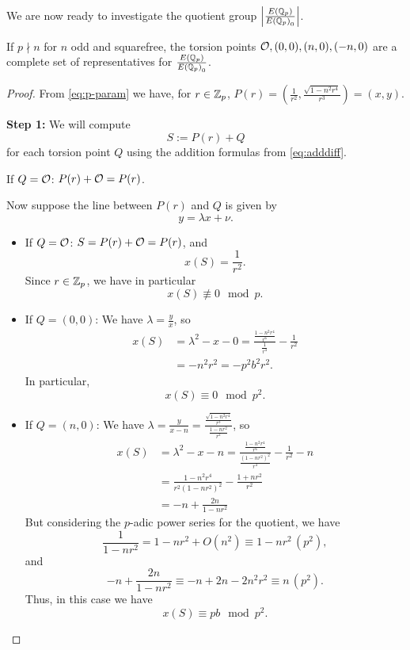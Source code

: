 \documentclass[12pt, a4paper]{report}
\begin{document}
We are now ready to investigate the quotient group $\left| \frac{{E({\mathbb Q}_p)}}{{E({\mathbb Q}_p)}_0}
\right|$.

\begin{thm} 
  If $p \nmid n$ for $n$ odd and squarefree, the torsion points ${\mathcal O}, (0,0), (n,0), (-n,0)$
  are a complete set of representatives for $\frac{{E({\mathbb Q}_p)}}{{E({\mathbb Q}_p)}_0}$.
\end{thm}
\begin{proof}
  From \autoref{eq:p-param} we have, for $r \in {\mathbb Z}_p$,
  $P(r) = (\frac{1}{r^2}, \frac{\sqrt{1-n^2r^4}}{r^3}) = (x,y)$.

  \textbf{Step 1:} We will compute $$S := P(r) + Q$$ for each torsion point $Q$ using
  the addition formulas from \autoref{eq:adddiff}.
   
  If $Q = {\mathcal O}$: $P(r) + {\mathcal O} = P(r)$.

  Now suppose the line between $P(r)$ and $Q$ is given by
  \[y = \lambda x + \nu.\]

  \begin{itemize}
    
  \item If $Q = {\mathcal O}$: $S = P(r) + {\mathcal O} = P(r)$, and
    \[x(S) = \frac{1}{r^2}.\]
    Since $r \in {\mathbb Z}_p$, we have in particular
    \[x(S) \not\equiv 0 \mod{p}.\]
    
  \item If $Q = (0,0)$:
  We have $\lambda = \frac{y}{x}$, so
  \begin{equation*}
    \begin{split}
      x(S)
      &= \lambda^2 - x - 0 =
      \frac{\frac{1 - n^2r^4}{r^6}}{\frac{1}{r^4}} - \frac{1}{r^2} \\
      &= -n^2r^2 = -p^2b^2r^2.
    \end{split}
  \end{equation*}
  In particular, 
  \[x(S) \equiv 0 \mod{p^2}.\]
  
\item If $Q = (n, 0)$: We have $\lambda = \frac{y}{x-n} =
  \frac{\frac{\sqrt{1-n^2r^4}}{r^3}}{\frac{1-nr^2}{r^2}}$, so
  \begin{equation*}
    \begin{split}
      x(S)
      &= \lambda^2 - x - n = 
      \frac{\frac{1 - n^2r^4}{r^6}}{\frac{(1-nr^2)^2}{r^4}} -
      \frac{1}{r^2} - n \\
      &= \frac{1-n^2r^4}{r^2(1-nr^2)^2} - \frac{1+nr^2}{r^2} \\
      &= -n + \frac{2n}{1-nr^2}
    \end{split}
  \end{equation*}
  But considering the $p$-adic power series for the quotient, we have
  \[\frac{1}{1-nr^2} = 1 - nr^2 + O(n^2) \equiv 1-nr^2 \, (p^2),\] and 
  \[-n + \frac{2n}{1-nr^2} \equiv -n + 2n - 2n^2r^2 \equiv n \, (p^2).\]
  Thus, in this case we have
  \[x(S) \equiv pb \mod{p^2}.\]


\end{itemize}
\end{proof}
\end{document}
